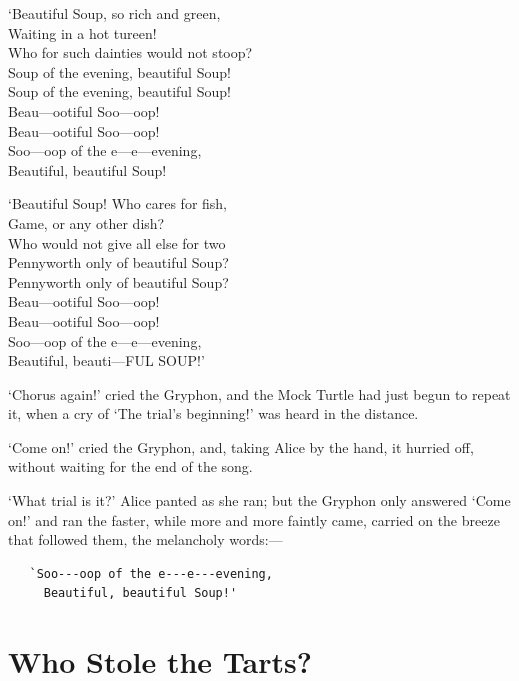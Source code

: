 \documentclass[12pt,openany]{memoir}
\renewenvironment{quote}%
  {\list{}{\leftmargin=2\parindent\rightmargin=0in}\item[]}%
  {\endlist}
\begin{document}
\begin{quote}
`Beautiful Soup, so rich and green,\\
Waiting in a hot tureen!\\
Who for such dainties would not stoop?\\
Soup of the evening, beautiful Soup!\\
Soup of the evening, beautiful Soup!\\
\hspace*{1em}Beau---ootiful Soo---oop!\\
\hspace*{1em}Beau---ootiful Soo---oop!\\
Soo---oop of the e---e---evening,\\
\hspace*{1em}Beautiful, beautiful Soup!

`Beautiful Soup! Who cares for fish,\\
Game, or any other dish?\\
Who would not give all else for two\\
Pennyworth only of beautiful Soup?\\
Pennyworth only of beautiful Soup?\\
\hspace*{1em}Beau---ootiful Soo---oop!\\
\hspace*{1em}Beau---ootiful Soo---oop!\\
Soo---oop of the e---e---evening,\\
\hspace*{1em}Beautiful, beauti---FUL SOUP!'
\end{quote}

`Chorus again!' cried the Gryphon, and the Mock Turtle had just begun to repeat it, when a cry of `The trial's beginning!' was heard in the distance.

`Come on!' cried the Gryphon, and, taking Alice by the hand, it hurried off, without waiting for the end of the song.

`What trial is it?' Alice panted as she ran; but the Gryphon only answered `Come on!' and ran the faster, while more and more faintly came, carried on the breeze that followed them, the melancholy words:---

\begin{verbatim}
   `Soo---oop of the e---e---evening,
     Beautiful, beautiful Soup!'
\end{verbatim}


\chapter{Who Stole the Tarts?}
\end{document}
